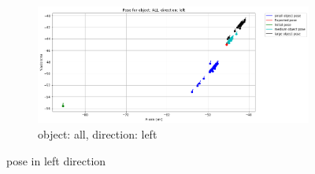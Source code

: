 \documentclass[10pt,a4paper]{article}
\begin{document}
								\begin{figure}[H]
%									
									\begin{subfigure}{\textwidth}
										\centering
										\includegraphics[width=0.8\linewidth]{img/pose_all_left.png}
										\caption{object: all, direction: left}
										\label{fig:object: all, direction: left}
									\end{subfigure}
									
									\caption{pose in left direction}
									\label{fig:pose in left direction}
								\end{figure}
								
\end{document}
